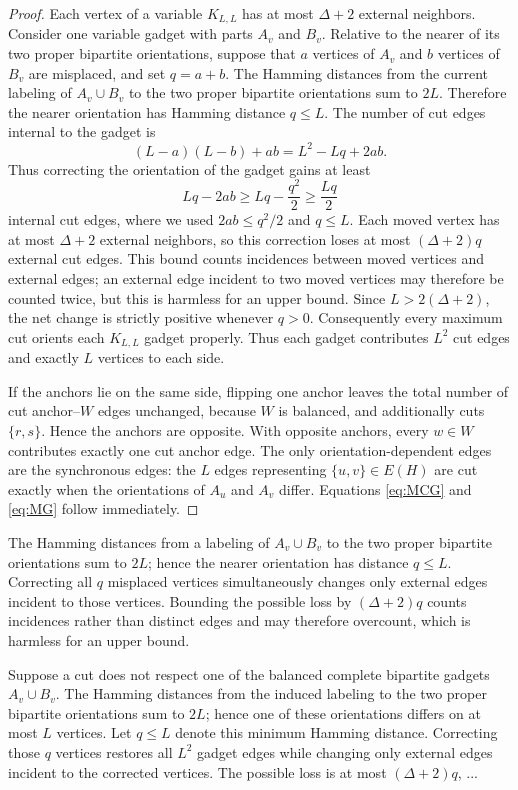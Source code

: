 \documentclass[11pt]{article}
\newcommand{\sh}[1]{{#1}}
\begin{document}
\begin{proof}
Each vertex of a variable $K_{L,L}$ has at most $\Delta+2$ external neighbors.  
Consider one variable gadget with parts $A_v$ and $B_v$.  Relative
to the nearer of its two proper bipartite orientations, suppose that
$a$ vertices of $A_v$ and $b$ vertices of $B_v$ are misplaced, and set
$q=a+b$.  %
The Hamming distances from the current labeling of
\(A_v\cup B_v\) to the two proper bipartite orientations sum to \(2L\).
Therefore the nearer orientation has Hamming distance
\(q\le L\).
The
number of cut edges internal to the gadget is
\[
(L-a)(L-b)+ab=L^2-Lq+2ab.
\]
Thus correcting the orientation of the gadget gains at least 
\[
Lq-2ab
   \geq Lq-\frac{q^2}{2}
   \geq \frac{Lq}{2}
\]
internal cut edges, where we used $2ab\leq q^2/2$ and $q\leq L$.
Each moved vertex has at most $\Delta+2$ external neighbors, so this
correction loses at most $(\Delta+2)q$ external cut edges.  
\sh{This bound counts incidences between moved vertices and external edges;
an external edge incident to two moved vertices may therefore be counted
twice, but this is harmless for an upper bound.} 
Since
$L>2(\Delta+2)$, the net change is strictly positive whenever $q>0$.
Consequently every maximum cut orients each $K_{L,L}$ gadget
properly.
Thus each gadget
contributes $L^2$ cut edges and exactly $L$ vertices to each side.

If the anchors lie on the same side, flipping one anchor leaves the total number of cut
anchor--$W$ edges unchanged, because $W$ is balanced, and additionally cuts $\{r,s\}$.
Hence the anchors are opposite.  With opposite anchors, every $w\in W$ contributes exactly
one cut anchor edge.  The only orientation-dependent edges are the synchronous edges:
the $L$ edges representing $\{u,v\}\in E( H)$ are cut exactly when the orientations
of $A_u$ and $A_v$ differ.  Equations \eqref{eq:MCG} and \eqref{eq:MG} follow immediately.
\end{proof}


The Hamming distances from a labeling of \(A_v\cup B_v\) to the two
proper bipartite orientations sum to \(2L\); hence the nearer
orientation has distance \(q\le L\).  Correcting all \(q\) misplaced
vertices simultaneously changes only external edges incident to those
vertices.  Bounding the possible loss by \((\Delta+2)q\) counts
incidences rather than distinct edges and may therefore overcount,
which is harmless for an upper bound.

Suppose a cut does not respect one of the balanced complete bipartite
gadgets \(A_v\cup B_v\). The Hamming distances from the induced labeling
to the two proper bipartite orientations sum to \(2L\); hence one of
these orientations differs on at most \(L\) vertices. Let \(q\le L\)
denote this minimum Hamming distance. Correcting those \(q\) vertices
restores all \(L^2\) gadget edges while changing only external edges
incident to the corrected vertices. The possible loss is at most
\((\Delta+2)q\), ...
\end{document}
